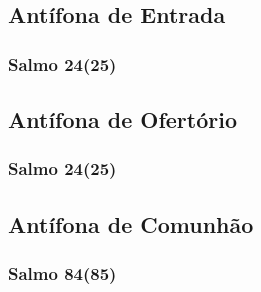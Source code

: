 \subsection{Antífona de Entrada}


\subsubsection{Salmo 24(25)}


\subsection{Antífona de Ofertório}


\subsubsection{Salmo 24(25)}


\subsection{Antífona de Comunhão}


\subsubsection{Salmo 84(85)}

